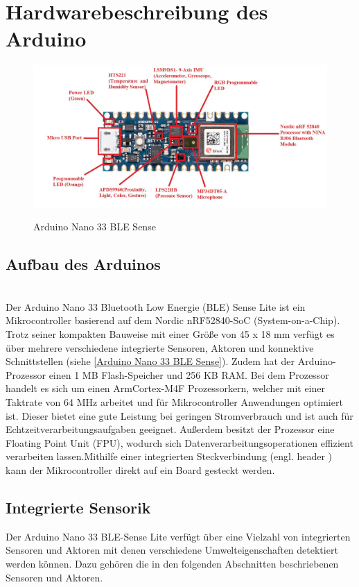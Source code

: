 
\chapter{Hardwarebeschreibung des Arduino}
\begin{figure}[htb]
	\begin{center}
		\includegraphics[width=\textwidth]{General/ArduinoBoard.png}
		\caption{Arduino Nano 33 BLE Sense}\cite{eTech.2021} \label{Arduino Nano 33 BLE Sense}
	\end{center}
\end{figure}
\section{Aufbau des Arduinos}
\cite{Ard.2024}
\\
Der Arduino Nano 33 Bluetooth Low Energie (BLE) Sense Lite ist ein Mikrocontroller basierend auf dem Nordic nRF52840-SoC (System-on-a-Chip). Trotz seiner kompakten Bauweise mit einer Größe von 45 x 18 mm verfügt es über mehrere verschiedene integrierte Sensoren, Aktoren und konnektive Schnittstellen (siehe \autoref{Arduino Nano 33 BLE Sense}). Zudem hat der Arduino-Prozessor einen 1 MB Flash-Speicher und 256 KB RAM. Bei dem Prozessor handelt es sich um einen Arm\textregistered Cortex-M4F Prozessorkern, welcher mit einer Taktrate von 64 MHz arbeitet und für Mikrocontroller Anwendungen optimiert ist. Dieser bietet eine gute Leistung bei geringen Stromverbrauch und ist auch für Echtzeitverarbeitungsaufgaben geeignet. Außerdem besitzt der Prozessor eine Floating Point Unit (FPU), wodurch sich Datenverarbeitungsoperationen effizient verarbeiten lassen.Mithilfe einer integrierten Steckverbindung (engl. \glqq header \grqq) kann der Mikrocontroller direkt auf ein Board gesteckt werden. \cite{Arm.2020}

\section{Integrierte Sensorik}
Der Arduino Nano 33 BLE-Sense Lite verfügt über eine Vielzahl von integrierten Sensoren und Aktoren mit denen verschiedene Umwelteigenschaften detektiert werden können. Dazu gehören die in den folgenden Abschnitten beschriebenen Sensoren und Aktoren.
